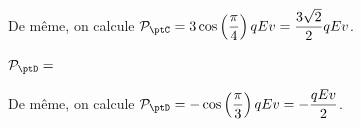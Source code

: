 %

\begin{corrige}
De même, on calcule  $\mathcal{P}_{\ptC}  =3\cos\left(\dfrac{\pi}{4}\right)qEv =\dfrac{3\sqrt{2}}{2}qEv$.
\end{corrige}



\begin{enonce}
$\mathcal{P}_{\ptD} = $
\end{enonce}

%

\begin{corrige}
De même, on calcule  $\mathcal{P}_{\ptD} =-\cos\left(\dfrac{\pi}{3}\right)qEv =-\dfrac{qEv}{2}$.
\end{corrige}



\finEntrainement





\newpage








\hauteurLargeurCadreReponse		{8mm}{2cm}
\typeEntrainement				{} %
\initialisationEntrainement


